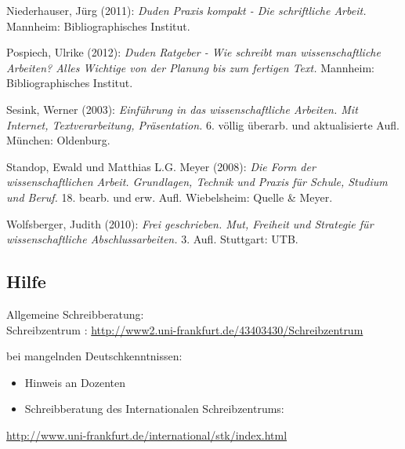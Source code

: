 \documentclass[ 12pt,
                titlepage,
                parskip=half,
                version=first,
                bibliography=totocnumbered,
                final,
                listof=totoc]{scrartcl}
\begin{document}
Niederhauser, Jürg (2011): \emph{Duden Praxis kompakt - Die schriftliche
Arbeit.} Mannheim: Bibliographisches Institut.

Pospiech, Ulrike (2012): \emph{Duden Ratgeber - Wie schreibt man
wissenschaftliche Arbeiten? Alles Wichtige von der Planung bis zum fertigen
Text.} Mannheim: Bibliographisches Institut.

Sesink, Werner (2003): \emph{Einführung in das wissenschaftliche Arbeiten. Mit
Internet, Textverarbeitung, Präsentation.} 6. völlig überarb. und aktualisierte
Aufl. München: Oldenburg.

Standop, Ewald und Matthias L.G. Meyer (2008): \emph{Die Form der
wissenschaftlichen Arbeit. Grundlagen, Technik und Praxis für Schule, Studium
und Beruf.} 18. bearb. und erw. Aufl. Wiebelsheim: Quelle \& Meyer.

Wolfsberger, Judith (2010): \emph{Frei geschrieben. Mut, Freiheit und Strategie
für wissenschaftliche Abschlussarbeiten.} 3. Aufl. Stuttgart: UTB.

\subsection*{Hilfe}
Allgemeine Schreibberatung: \\Schreibzentrum :
\url{http://www2.uni-frankfurt.de/43403430/Schreibzentrum}

bei mangelnden Deutschkenntnissen:
\begin{itemize}
    \item Hinweis an Dozenten
    \item Schreibberatung des Internationalen Schreibzentrums:
\end{itemize}
\url{http://www.uni-frankfurt.de/international/stk/index.html}

\newpage
{}
\listoffigures
\newpage
\listoftables
{}
\end{document}
